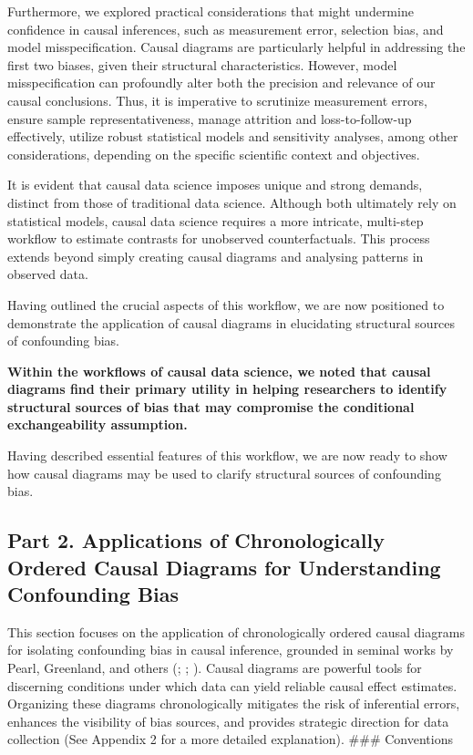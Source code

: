 \documentclass[
  singlecolumn,
  9pt]{article}
\begin{document}
Furthermore, we explored practical considerations that might undermine
confidence in causal inferences, such as measurement error, selection
bias, and model misspecification. Causal diagrams are particularly
helpful in addressing the first two biases, given their structural
characteristics. However, model misspecification can profoundly alter
both the precision and relevance of our causal conclusions. Thus, it is
imperative to scrutinize measurement errors, ensure sample
representativeness, manage attrition and loss-to-follow-up effectively,
utilize robust statistical models and sensitivity analyses, among other
considerations, depending on the specific scientific context and
objectives.

It is evident that causal data science imposes unique and strong
demands, distinct from those of traditional data science. Although both
ultimately rely on statistical models, causal data science requires a
more intricate, multi-step workflow to estimate contrasts for unobserved
counterfactuals. This process extends beyond simply creating causal
diagrams and analysing patterns in observed data.

Having outlined the crucial aspects of this workflow, we are now
positioned to demonstrate the application of causal diagrams in
elucidating structural sources of confounding bias.

\textbf{Within the workflows of causal data science, we noted that
causal diagrams find their primary utility in helping researchers to
identify structural sources of bias that may compromise the conditional
exchangeability assumption.}

Having described essential features of this workflow, we are now ready
to show how causal diagrams may be used to clarify structural sources of
confounding bias.

\subsection{Part 2. Applications of Chronologically Ordered Causal
Diagrams for Understanding Confounding
Bias}\label{part-2.-applications-of-chronologically-ordered-causal-diagrams-for-understanding-confounding-bias}

This section focuses on the application of chronologically ordered
causal diagrams for isolating confounding bias in causal inference,
grounded in seminal works by Pearl, Greenland, and others
(;
; ). Causal diagrams are powerful tools for discerning
conditions under which data can yield reliable causal effect estimates.
Organizing these diagrams chronologically mitigates the risk of
inferential errors, enhances the visibility of bias sources, and
provides strategic direction for data collection (See Appendix 2 for a
more detailed explanation). \#\#\# Conventions
\end{document}
